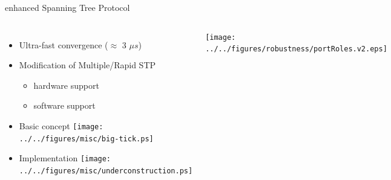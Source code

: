 \documentclass[compress,red]{beamer}
\begin{document}
\begin{frame}{enhanced Spanning Tree Protocol}

\begin{columns}[c]

  \begin{itemize}
    \item Ultra-fast convergence ($\approx$ 3 $\mu s$)
    \item Modification of Multiple/Rapid STP 
    \begin{itemize}
      \item hardware support
      \item software support
     \end{itemize}
    \item Basic concept  \texttt{[image: ../../figures/misc/big-tick.ps]}
    \item Implementation \texttt{[image: ../../figures/misc/underconstruction.ps]}
  \end{itemize}


      \begin{center}
	\texttt{[image: ../../figures/robustness/portRoles.v2.eps]}
      \end{center}

 \end{columns}

\end{frame}
\end{document}
